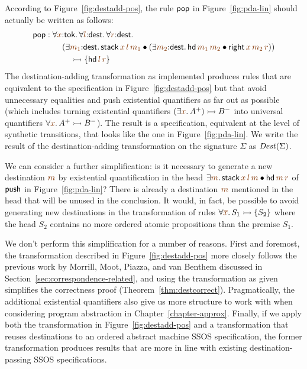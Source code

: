According to Figure~\ref{fig:destadd-pos}, the rule 
${\sf pop}$ in Figure~\ref{fig:pda-lin} should actually be written as
follows:
\begin{align*} 
  {\sf pop} & : 
  \forall \lf x{:}{\sf tok}.\,
  \forall \lf l{:}{\sf dest}.\,
  \forall \lf r{:}{\sf dest}.\,
  \\
  & \qquad (\exists \lf{m_1}{:}{\sf dest}.\, {\sf stack}\,\lf{x}\,\lf{l}\,\lf{m_1} \fuse
   (\exists \lf{m_2}{:}{\sf dest}.\, {\sf hd}\,\lf{m_1}\,\lf{m_2} \fuse
     {\sf right}\,\lf{x}\,\lf{m_2}\,\lf{r}))
  \\ 
  & \qquad\quad \lefti
  \{ 
    {\sf hd}\,\lf{l}\,\lf{r}
  \}
\end{align*}
The destination-adding transformation as
implemented produces rules that are
equivalent to the specification in Figure~\ref{fig:destadd-pos} but
that avoid unnecessary equalities and push existential quantifiers as
far out as possible (which includes turning existential quantifiers
$(\exists \lf x.\,A^+) \lefti B^-$ into universal quantifiers $\forall
\lf x.\,A^+ \lefti B^-$). The result is a specification, equivalent
at the level of synthetic transitions, that looks like the one in
Figure~\ref{fig:pda-lin}. We write the result of the
destination-adding transformation on the signature $\Sigma$ as ${\it
  Dest}(\Sigma)$.

We can consider a further simplification: is it necessary to generate
a new destination $\lf{m}$ by existential quantification in the head
$\exists \lf{m}.\,{\sf stack}\,\lf{x}\,\lf{l}\,\lf{m} \fuse {\sf hd}\,\lf{m}\,\lf{r}$ of ${\sf
  push}$ in Figure~\ref{fig:pda-lin}? There is already a destination
$\lf m$ mentioned in the head that will be unused in the conclusion.  It
would, in fact, be possible to avoid generating new destinations in
the transformation of rules $\forall \lf{\overline{x}}.\,S_1 \lefti \{ S_2
\}$ where the head $S_2$ contains no more ordered atomic propositions
than the premise $S_1$. 

We don't perform this simplification for a number of reasons. First
and foremost, the transformation described in
Figure~\ref{fig:destadd-pos} more closely follows the previous work by
Morrill, Moot, Piazza, and van Benthem discussed in
Section~\ref{sec:correspondence-related}, and using the transformation as given
simplifies the correctness proof (Theorem~\ref{thm:destcorrect}).
Pragmatically, the additional existential quantifiers also give us
more structure to work with when considering program abstraction in
Chapter~\ref{chapter-approx}. Finally, if we apply both the transformation in
Figure~\ref{fig:destadd-pos} and a transformation that reuses
destinations to an ordered abstract machine SSOS specification, the
former transformation produces results that are more in line with
existing destination-passing SSOS specifications.

